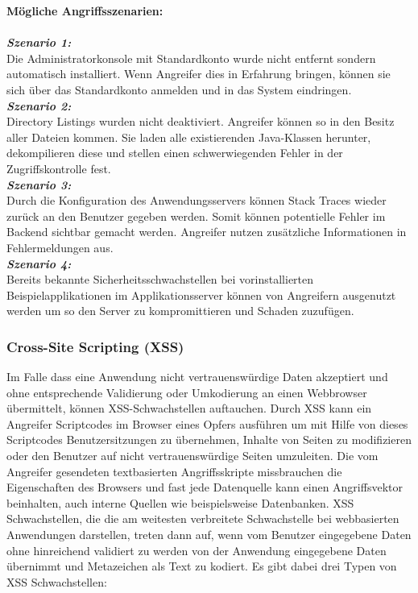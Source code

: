 \textbf{Mögliche Angriffsszenarien:}\\
\\
\textbf{\textit{Szenario 1:}}\\

Die Administratorkonsole mit Standardkonto wurde nicht entfernt sondern automatisch installiert. Wenn Angreifer dies in Erfahrung bringen, können sie sich über das Standardkonto anmelden und in das System eindringen\cite[12]{owasp17top10}.\\

\textbf{\textit{Szenario 2:}}\\

Directory Listings wurden nicht deaktiviert. Angreifer können so in den Besitz aller Dateien kommen. Sie laden alle existierenden Java-Klassen herunter,
dekompilieren diese und stellen einen schwerwiegenden Fehler in der Zugriffskontrolle fest\cite[12]{owasp17top10}.\\

\textbf{\textit{Szenario 3:}}\\

Durch die Konfiguration des Anwendungsservers können Stack Traces wieder zurück an den Benutzer gegeben werden. Somit können potentielle Fehler im Backend sichtbar gemacht werden. Angreifer nutzen zusätzliche Informationen in Fehlermeldungen aus\cite[12]{owasp17top10}.\\

\textbf{\textit{Szenario 4:}}\\

Bereits bekannte Sicherheitsschwachstellen bei vorinstallierten Beispielapplikationen im Applikationsserver können von Angreifern ausgenutzt werden um so den Server zu kompromittieren und Schaden zuzufügen\cite[12]{owasp17top10}.\\

\subsubsection{Cross-Site Scripting (XSS)}

Im Falle dass eine Anwendung nicht vertrauenswürdige Daten akzeptiert und ohne entsprechende Validierung oder Umkodierung an einen Webbrowser übermittelt, können XSS-Schwachstellen auftauchen. Durch XSS kann ein Angreifer Scriptcodes im Browser eines Opfers ausführen um mit Hilfe von dieses Scriptcodes Benutzersitzungen zu übernehmen, Inhalte von Seiten zu modifizieren oder den Benutzer auf nicht vertrauenswürdige Seiten umzuleiten\cite[6]{owasp17top10}. Die vom Angreifer gesendeten textbasierten Angriffsskripte missbrauchen die Eigenschaften des Browsers und fast jede Datenquelle kann einen Angriffsvektor beinhalten, auch interne Quellen wie beispielsweise Datenbanken. XSS Schwachstellen, die die am weitesten verbreitete Schwachstelle bei webbasierten Anwendungen darstellen, treten dann auf, wenn vom Benutzer eingegebene Daten ohne hinreichend validiert zu werden von der Anwendung eingegebene Daten übernimmt und Metazeichen als Text zu kodiert. Es gibt dabei drei Typen von XSS Schwachstellen:\\

